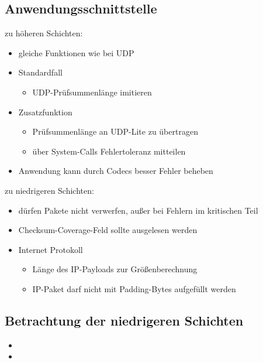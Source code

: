 \documentclass{beamer}
\begin{document}
\subsection{Anwendungsschnittstelle}
\begin{frame}
zu höheren Schichten:
\begin{itemize}
\item gleiche Funktionen wie bei UDP
\item Standardfall
	\begin{itemize}
	\item UDP-Prüfsummenlänge imitieren
	\end{itemize}
\item Zusatzfunktion 
	\begin{itemize}
	\item Prüfsummenlänge an UDP-Lite zu übertragen
	\item über System-Calls Fehlertoleranz mitteilen
	\end{itemize}
\item Anwendung kann durch Codecs besser Fehler beheben
\end{itemize}

zu niedrigeren Schichten:
\begin{itemize}
\item dürfen Pakete nicht verwerfen, außer bei Fehlern im kritischen Teil
\item Checksum-Coverage-Feld sollte ausgelesen werden
\end{itemize}
\begin{itemize}
\item Internet Protokoll
	\begin{itemize}
	\item Länge des IP-Payloads zur Größenberechnung
	\item IP-Paket darf nicht mit Padding-Bytes aufgefüllt werden
	\end{itemize}
\end{itemize}
\end{frame}


\subsection{Betrachtung der niedrigeren Schichten}

\begin{frame}
\begin{itemize}

\item 
\item 
\end{itemize}
\end{frame}
\end{document}
